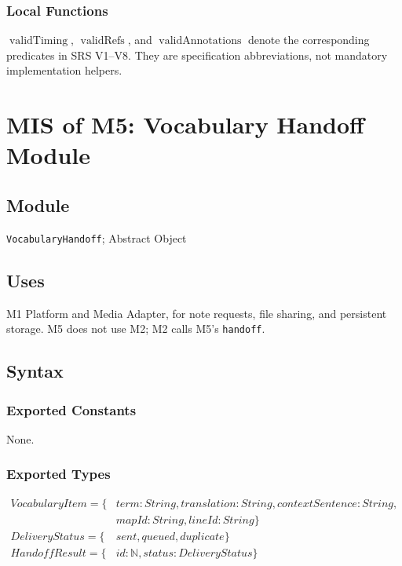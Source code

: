 \documentclass[12pt, titlepage]{article}
\begin{document}
\subsubsection{Local Functions}
$\operatorname{validTiming}$, $\operatorname{validRefs}$,
and $\operatorname{validAnnotations}$ denote the corresponding
predicates in SRS V1--V8. They are specification abbreviations,
not mandatory implementation helpers.

\clearpage
\section{MIS of M5: Vocabulary Handoff Module} \label{mVocabularyHandoff}

\subsection{Module}

\texttt{VocabularyHandoff}; Abstract Object

\subsection{Uses}

M1 Platform and Media Adapter, for note requests, file sharing, and
persistent storage.  M5 does not use M2; M2 calls M5's \texttt{handoff}.

\subsection{Syntax}

\subsubsection{Exported Constants}

None.

\subsubsection{Exported Types}

\begin{align*}
\textit{VocabularyItem} = \{&\textit{term}: \textit{String},
  \textit{translation}: \textit{String},
  \textit{contextSentence}: \textit{String}, \\
  &\textit{mapId}: \textit{String},
  \textit{lineId}: \textit{String}\} \\
\textit{DeliveryStatus} = \{&\textit{sent}, \textit{queued},
  \textit{duplicate}\} \\
\textit{HandoffResult} = \{&\textit{id}: \mathbb{N},
  \textit{status}: \textit{DeliveryStatus}\}
\end{align*}
\end{document}
